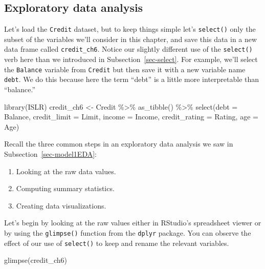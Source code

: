\documentclass[
  letterpaper,
  DIV=11,
  numbers=noendperiod]{scrreprt}
\newenvironment{Shaded}{\begin{snugshade}}{\end{snugshade}}
\newcommand{\AttributeTok}[1]{\textcolor[rgb]{0.40,0.45,0.13}{#1}}
\newcommand{\FunctionTok}[1]{\textcolor[rgb]{0.28,0.35,0.67}{#1}}
\newcommand{\NormalTok}[1]{\textcolor[rgb]{0.00,0.23,0.31}{#1}}
\newcommand{\OtherTok}[1]{\textcolor[rgb]{0.00,0.23,0.31}{#1}}
\newcommand{\SpecialCharTok}[1]{\textcolor[rgb]{0.37,0.37,0.37}{#1}}
\providecommand{\tightlist}{%
  \setlength{\itemsep}{0pt}\setlength{\parskip}{0pt}}\usepackage{longtable,booktabs,array}
\theoremstyle{definition}
\theoremstyle{remark}
\begin{document}
\hypertarget{sec-model3EDA}{%
\subsection{Exploratory data analysis}\label{sec-model3EDA}}

Let's load the \texttt{Credit} dataset,
but to keep things simple let's \texttt{select()} only the subset of the
variables we'll consider in this chapter, and save this data in a new
data frame called \texttt{credit\_ch6}. Notice our slightly different
use of the \texttt{select()} verb here than we introduced in
Subsection~\ref{sec-select}. For example, we'll select the
\texttt{Balance} variable from \texttt{Credit} but then save it with a
new variable name \texttt{debt}. We do this because here the term
``debt'' is a little more interpretable than ``balance.''

\begin{Shaded}
\begin{Highlighting}[]
\FunctionTok{library}\NormalTok{(ISLR)}
\NormalTok{credit\_ch6 }\OtherTok{\textless{}{-}}\NormalTok{ Credit }\SpecialCharTok{\%\textgreater{}\%}
  \FunctionTok{as\_tibble}\NormalTok{() }\SpecialCharTok{\%\textgreater{}\%} 
  \FunctionTok{select}\NormalTok{(}\AttributeTok{debt =}\NormalTok{ Balance, }\AttributeTok{credit\_limit =}\NormalTok{ Limit, }
         \AttributeTok{income =}\NormalTok{ Income, }\AttributeTok{credit\_rating =}\NormalTok{ Rating, }\AttributeTok{age =}\NormalTok{ Age)}
\end{Highlighting}
\end{Shaded}

Recall the three common steps in an exploratory data analysis we saw in
Subsection~\ref{sec-model1EDA}:

\begin{enumerate}
\def\labelenumi{\arabic{enumi}.}
\tightlist
\item
  Looking at the raw data values.
\item
  Computing summary statistics.
\item
  Creating data visualizations.
\end{enumerate}

Let's begin by looking at the raw values either in RStudio's spreadsheet
viewer or by using the \texttt{glimpse()} function from the
\texttt{dplyr} package. You can observe the effect of our use of
\texttt{select()} to keep and rename the relevant variables.

\begin{Shaded}
\begin{Highlighting}[]
\FunctionTok{glimpse}\NormalTok{(credit\_ch6)}
\end{Highlighting}
\end{Shaded}
\end{document}

